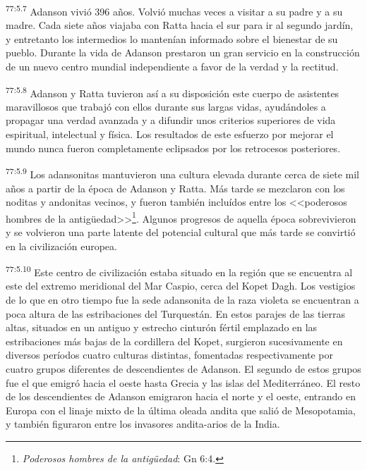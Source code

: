 \par
\textsuperscript{77:5.7} Adanson vivió 396 años. Volvió muchas veces a visitar a su padre y a su madre. Cada siete años viajaba con Ratta hacia el sur para ir al segundo jardín, y entretanto los intermedios lo mantenían informado sobre el bienestar de su pueblo. Durante la vida de Adanson prestaron un gran servicio en la construcción de un nuevo centro mundial independiente a favor de la verdad y la rectitud.

\par
\textsuperscript{77:5.8} Adanson y Ratta tuvieron así a su disposición este cuerpo de asistentes maravillosos que trabajó con ellos durante sus largas vidas, ayudándoles a propagar una verdad avanzada y a difundir unos criterios superiores de vida espiritual, intelectual y física. Los resultados de este esfuerzo por mejorar el mundo nunca fueron completamente eclipsados por los retrocesos posteriores.

\par
\textsuperscript{77:5.9} Los adansonitas mantuvieron una cultura elevada durante cerca de siete mil años a partir de la época de Adanson y Ratta. Más tarde se mezclaron con los noditas y andonitas vecinos, y fueron también incluídos entre los <<poderosos hombres de la antig\"uedad>>\footnote{\textit{Poderosos hombres de la antig\"uedad}: Gn 6:4.}. Algunos progresos de aquella época sobrevivieron y se volvieron una parte latente del potencial cultural que más tarde se convirtió en la civilización europea.

\par
\textsuperscript{77:5.10} Este centro de civilización estaba situado en la región que se encuentra al este del extremo meridional del Mar Caspio, cerca del Kopet Dagh. Los vestigios de lo que en otro tiempo fue la sede adansonita de la raza violeta se encuentran a poca altura de las estribaciones del Turquestán. En estos parajes de las tierras altas, situados en un antiguo y estrecho cinturón fértil emplazado en las estribaciones más bajas de la cordillera del Kopet, surgieron sucesivamente en diversos períodos cuatro culturas distintas, fomentadas respectivamente por cuatro grupos diferentes de descendientes de Adanson. El segundo de estos grupos fue el que emigró hacia el oeste hasta Grecia y las islas del Mediterráneo. El resto de los descendientes de Adanson emigraron hacia el norte y el oeste, entrando en Europa con el linaje mixto de la última oleada andita que salió de Mesopotamia, y también figuraron entre los invasores andita-arios de la India.

